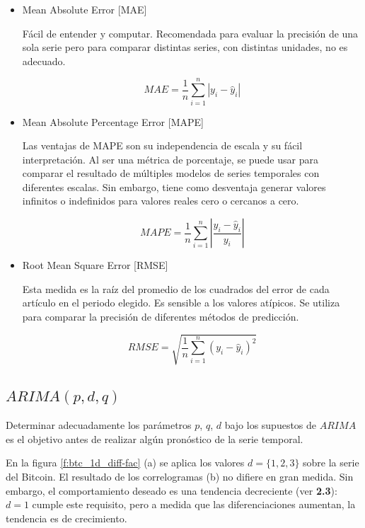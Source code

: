 \documentclass[a4paper,10pt]{article}
\begin{document}
\begin{itemize}

\item Mean Absolute Error [MAE]

Fácil de entender y computar. Recomendada para evaluar la precisión de una sola serie pero para comparar distintas series, con distintas unidades, no es adecuado.

\begin{equation*}
MAE = \frac{1}{n} \sum_{i=1}^n |y_i - \hat{y}_i |
\end{equation*}

\item Mean Absolute Percentage Error [MAPE]

Las ventajas de MAPE son su independencia de escala y su fácil interpretación. Al ser una métrica de porcentaje, se puede usar para comparar el resultado de múltiples modelos de series temporales con diferentes escalas. Sin embargo, tiene como desventaja generar valores infinitos o indefinidos para valores reales cero o cercanos a cero.

\begin{equation*}
MAPE = \frac{1}{n} \sum_{i=1}^n |\frac{y_i - \hat{y}_i}{y_i}|
\end{equation*}

\item Root Mean Square Error [RMSE]

Esta  medida  es la  raíz  del  promedio  de  los cuadrados del error de cada artículo en el periodo elegido. Es sensible a los valores atípicos. Se utiliza para comparar la precisión de diferentes métodos de predicción.

\begin{equation*}
RMSE = \sqrt{\frac{1}{n} \sum_{i=1}^n (y_i - \hat{y}_i )^2}
\end{equation*}

\end{itemize}

\subsection{$ARIMA(p,d,q)$}

Determinar adecuadamente los parámetros $p$, $q$, $d$ bajo los supuestos de $ARIMA$ es el objetivo antes de realizar algún pronóstico de la serie temporal.

En la figura \ref{f:btc_1d_diff-fac} (a) se aplica los valores $d=\{1,2,3\}$ sobre la serie del Bitcoin. El resultado de los correlogramas (b) no difiere en gran medida. Sin embargo, el comportamiento deseado es una tendencia decreciente (ver \textbf{2.3}): $d=1$ cumple este requisito, pero a medida que las diferenciaciones aumentan, la tendencia es de crecimiento.
\end{document}
